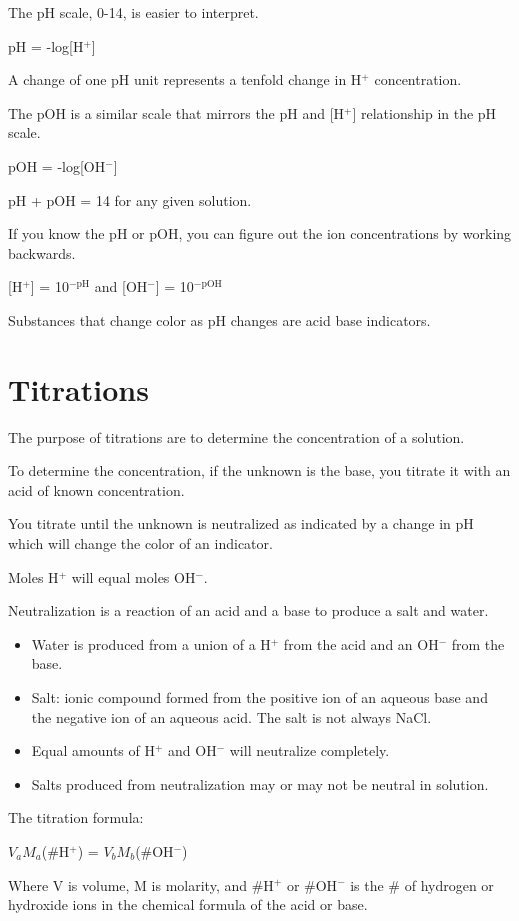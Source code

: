 \documentclass[../hchem.tex]{subfiles}
\begin{document}
The pH scale, 0-14, is easier to interpret.

pH = -log[H$^+$]

A change of one pH unit represents a tenfold change in H$^+$ concentration.

The pOH is a similar scale that mirrors the pH and [H$^+$] relationship in the pH scale.

pOH = -log[OH$^-$]

pH + pOH = 14 for any given solution. 

If you know the pH or pOH, you can figure out the ion concentrations by working backwards.

[H$^+$] = 10$^{-\text{pH}}$ and [OH$^-$] = 10$^{-\text{pOH}}$

Substances that change color as pH changes are acid base indicators.
\section{Titrations}
The purpose of titrations are to determine the concentration of a solution.

To determine the concentration, if the unknown is the base, you titrate it with an acid of known concentration.

You titrate until the unknown is neutralized as indicated by a change in pH which will change the color of an indicator.

Moles H$^+$ will equal moles OH$^-$.

Neutralization is a reaction of an acid and a base to produce a salt and water.
\begin{itemize}
    \item Water is produced from a union of a H$^+$ from the acid and an OH$^-$ from the base.
    \item Salt: ionic compound formed from the positive ion of an aqueous base and the negative ion of an aqueous acid. The salt is not always NaCl.
    \item Equal amounts of H$^+$ and OH$^-$ will neutralize completely.
    \item Salts produced from neutralization may or may not be neutral in solution.
\end{itemize}

The titration formula:
\begin{center}
    $V_aM_a$(\#H$^+$) = $V_bM_b$(\#OH$^-$)
\end{center}

Where V is volume, M is molarity, and \#H$^+$ or \#OH$^-$ is the \# of hydrogen or hydroxide ions in the chemical formula of the acid or base.
\end{document}
